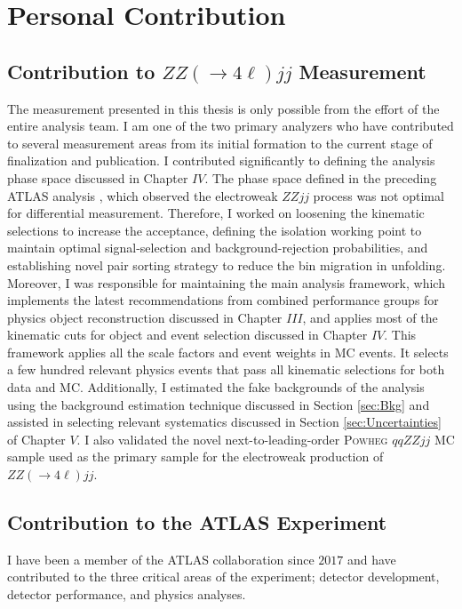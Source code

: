 \section{Personal Contribution}
\label{Appendix:Contribution}

\subsection{Contribution to $ZZ(\rightarrow 4\ell)jj$ Measurement} 
\label{subsec:ZZjjContr}

The measurement presented in this thesis is only possible from the effort of the entire analysis team. I am one of the two primary analyzers who have contributed to several measurement areas from its initial formation to the current stage of finalization and publication. I contributed significantly to defining the analysis phase space discussed in Chapter $IV$. The phase space defined in the preceding ATLAS analysis \cite{ATLASZZjj}, which observed the electroweak $ZZjj$ process was not optimal for differential measurement. Therefore, I worked on loosening the kinematic selections to increase the acceptance, defining the isolation working point to maintain optimal signal-selection and background-rejection probabilities, and establishing novel pair sorting strategy to reduce the bin migration in unfolding. Moreover, I was responsible for maintaining the main analysis framework, which implements the latest recommendations from combined performance groups for physics object reconstruction discussed in Chapter $III$, and applies most of the kinematic cuts for object and event selection discussed in Chapter $IV$. This framework applies all the scale factors and event weights in MC events. It selects a few hundred relevant physics events that pass all kinematic selections for both data and MC. Additionally, I estimated the fake backgrounds of the analysis using the background estimation technique discussed in Section \ref{sec:Bkg} and assisted in selecting relevant systematics discussed in Section \ref{sec:Uncertainties} of Chapter $V$. I also validated the novel next-to-leading-order \textsc{Powheg} $qqZZjj$ MC sample used as the primary sample for the electroweak production of $ZZ(\rightarrow 4\ell)jj$. 

\subsection{Contribution to the ATLAS Experiment}
\label{subsec:ATLASContr}
I have been a member of the ATLAS collaboration since $2017$ and have contributed to the three critical areas of the experiment; detector development, detector performance, and physics analyses.

